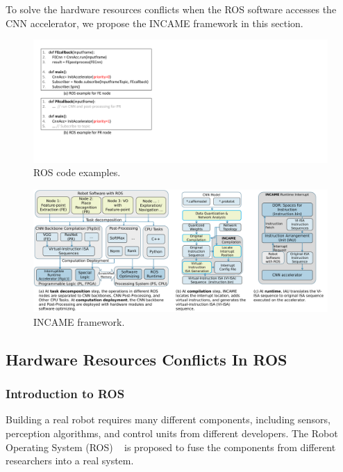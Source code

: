 \label{sec:incame}

To solve the hardware resources conflicts when the ROS software accesses the CNN accelerator, we propose the INCAME framework in this section.



\begin{figure}[t]
	\centering
    \setlength{\abovecaptionskip}{0.cm} 
    \includegraphics[width=0.9\linewidth]{fig/codeexample.pdf}
    \caption{ ROS code examples.}
	\label{fig:rosexample}
\end{figure}

\begin{figure}[t]
	\centering
    \setlength{\abovecaptionskip}{0cm} 
    \includegraphics[width=0.99\linewidth]{fig/incame.pdf}
    \caption{ INCAME framework.}
	\label{fig:incame}
\end{figure}

\subsection{Hardware Resources Conflicts In ROS}
\subsubsection{Introduction to ROS} Building a real robot requires many different components, including sensors, perception algorithms, and control units from different developers. The Robot Operating System (ROS)  ~\cite{quigley2009ros} is proposed to fuse the components from different researchers into a real system.

